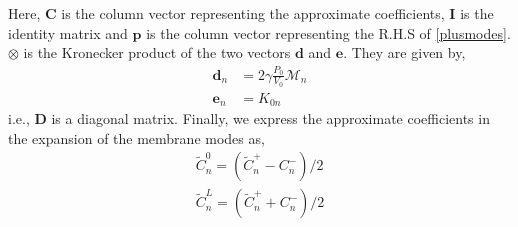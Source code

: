 \documentclass[a4paper,10pt]{article}
\begin{document}
Here, $\mathbf{C}$ is the column vector representing the approximate coefficients, $\mathbf{I}$ is the
identity matrix and $\mathbf{p}$ is the column vector representing the R.H.S of \eqref{plusmodes}. $\otimes$ is
the Kronecker product of the two vectors $\mathbf{d}$ and $\mathbf{e}$. They are given by,
\begin{align}
 \mathbf{d}_n&=2\gamma\frac{P_0}{V_0}\mathcal{M}_n\\
 \mathbf{e}_n&=K_{0n}
\end{align}
i.e., $\mathbf{D}$ is a diagonal matrix. Finally, we express the approximate coefficients in the expansion
of the membrane modes as,
\begin{align}
 \widetilde{C}^0_n=(\widetilde{C}^+_n-C^-_n)/2 \label{ipsiapproxfinal}\\
 \widetilde{C}^L_n=(\widetilde{C}^+_n+C^-_n)/2 \label{contraapproxfinal}
\end{align}
\end{document}
